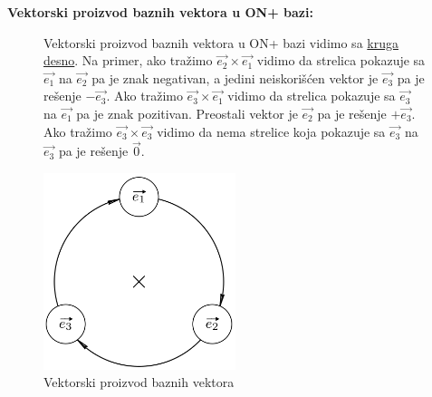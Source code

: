 \documentclass[12pt]{article}
\newcommand{\vek}[1]{\overrightarrow{#1}}
\begin{document}
\textbf{Vektorski proizvod baznih vektora u ON+ bazi:}
\begin{figure}[h]
    \begin{minipage}{0.55\textwidth}
        Vektorski proizvod baznih vektora u ON+ bazi vidimo sa
        \hyperref[pic::vektorski_krug]{kruga desno}. Na primer, ako tražimo
        $\vek{e_2}\times\vek{e_1}$ vidimo da strelica pokazuje sa
        $\vek{e_1}$ na $\vek{e_2}$ pa je znak negativan, a jedini
        neiskorišćen vektor je $\vek{e_3}$ pa je rešenje $-\vek{e_3}$. Ako
        tražimo $\vek{e_3}\times\vek{e_1}$ vidimo da strelica pokazuje sa
        $\vek{e_3}$ na $\vek{e_1}$ pa je znak pozitivan. Preostali vektor
        je $\vek{e_2}$ pa je rešenje $+\vek{e_3}$. Ako tražimo
        $\vek{e_3}\times\vek{e_3}$ vidimo da nema strelice koja pokazuje sa
        $\vek{e_3}$ na $\vek{e_3}$ pa je rešenje $\vek{0}$.
    \end{minipage}
    \hfill
    \begin{minipage}{0.4\textwidth}
        \centering
        \includegraphics[width=0.5\textwidth]{vektorski_proizvod_krug.png}
        \caption*{Vektorski proizvod baznih vektora\cite{book::first}}
        \label{pic::vektorski_krug}
    \end{minipage}
\end{figure}

\par
\end{document}
